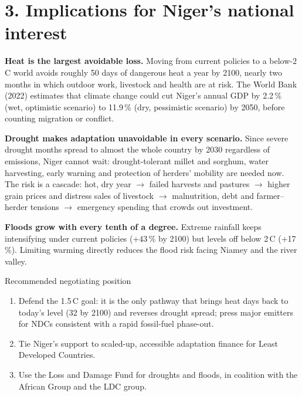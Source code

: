 \documentclass[10pt,a4paper]{article}
\newcommand{\degC}{\,\textdegree C}
\begin{document}
\section{3. Implications for Niger's national interest}

\textbf{Heat is the largest avoidable loss.} Moving from current policies to a below-2\degC{} world avoids
roughly 50 days of dangerous heat a year by 2100, nearly two months in which outdoor work, livestock and
health are at risk. The World Bank (2022) estimates that climate change could cut Niger's annual GDP by
2.2\,\% (wet, optimistic scenario) to 11.9\,\% (dry, pessimistic scenario) by 2050, before counting migration
or conflict.

\textbf{Drought makes adaptation unavoidable in every scenario.} Since severe drought months spread to almost
the whole country by 2030 regardless of emissions, Niger cannot wait: drought-tolerant millet and sorghum,
water harvesting, early warning and protection of herders' mobility are needed now. The risk is a cascade:
hot, dry year $\rightarrow$ failed harvests and pastures $\rightarrow$ higher grain prices and distress sales
of livestock $\rightarrow$ malnutrition, debt and farmer--herder tensions $\rightarrow$ emergency spending that
crowds out investment.

\textbf{Floods grow with every tenth of a degree.} Extreme rainfall keeps intensifying under current policies
(+43\,\% by 2100) but levels off below 2\degC{} (+17\,\%). Limiting warming directly reduces the flood risk
facing Niamey and the river valley.

\begin{graybox}{Recommended negotiating position}
\begin{enumerate}[label=(\roman*)]
  \item Defend the 1.5\degC{} goal: it is the only pathway that brings heat days back to today's level
        (32 by 2100) and reverses drought spread; press major emitters for NDCs consistent with a rapid
        fossil-fuel phase-out.
  \item Tie Niger's support to scaled-up, accessible adaptation finance for Least Developed Countries.
  \item Use the Loss and Damage Fund for droughts and floods, in coalition with the African Group and the
        LDC group.
\end{enumerate}
\end{graybox}
\end{document}
